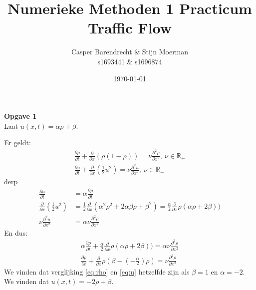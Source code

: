 \documentclass{article}
\title{Numerieke Methoden 1 Practicum Traffic Flow}
\author{Casper Barendrecht \& Stijn Moerman\\ s1693441 \& s1696874}
\date{\today}
\begin{document}
\maketitle



\textbf{Opgave 1}\\
Laat \(u(x,t)=\alpha\rho + \beta\).

Er geldt:
\begin{align}
	\frac{\partial \rho}{\partial t}+\frac{\partial}{\partial x}(\rho(1-\rho))=\nu \frac{\partial^2 \rho}{\partial x^2},~\nu\in \mathbb{R}_+ \label{eq:rho}\\
 \frac{\partial u}{\partial t}+\frac{\partial}{\partial x}\left(\frac{1}{2}u^2\right) = \nu \frac{\partial^2 u}{\partial x^2},~\nu\in \mathbb{R}_+\label{eq:u}
\end{align}
derp
\begin{align*}
 \frac{\partial u}{\partial t} &=\alpha\frac{\partial \rho}{\partial t}\\
\frac{\partial}{\partial x}\left(\frac{1}{2}u^2\right)&=\frac{1}{2}\frac{\partial}{\partial x}(\alpha^2\rho^2 +2\alpha\beta\rho+\beta^2)= \frac{\alpha}{2}\frac{\partial}{\partial x}\rho(\alpha\rho+2\beta))\\
\nu \frac{\partial^2 u}{\partial x^2}&=\alpha \nu\frac{\partial^2 \rho}{\partial x^2}
\end{align*}
En dus:
\begin{align*}
	\alpha\frac{\partial \rho}{\partial t}+\frac{\alpha}{2}\frac{\partial}{\partial x}\rho(\alpha\rho+2\beta))=\alpha \nu\frac{\partial^2 \rho}{\partial x^2}\\
		\frac{\partial \rho}{\partial t}+\frac{\partial}{\partial x}\rho(\beta-(-\frac{\alpha}{2})\rho)=\nu\frac{\partial^2 \rho}{\partial x^2}
\end{align*}
We vinden dat verglijking \eqref{eq:rho} en \eqref{eq:u} hetzelfde zijn als \(\beta=1\) en \(\alpha=-2\). We vinden dat \(u(x,t)=-2\rho+\beta\).\\
\end{document}

